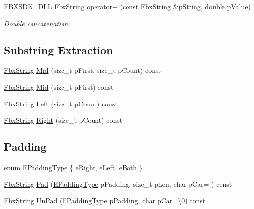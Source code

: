 \begin{DoxyCompactItemize}
\item 
\hyperlink{fbxarch_8h_a25d1298b33c31da5dbed969e0d4b4bc1}{F\+B\+X\+S\+D\+K\+\_\+\+D\+LL} \hyperlink{class_fbx_string}{Fbx\+String} \hyperlink{class_fbx_string_a358d5e7bed17720e4310db397dbcbf53}{operator+} (const \hyperlink{class_fbx_string}{Fbx\+String} \&p\+String, double p\+Value)
\begin{DoxyCompactList}\small\item\em Double concatenation. \end{DoxyCompactList}\end{DoxyCompactItemize}
\subsection*{Substring Extraction}
\begin{DoxyCompactItemize}
\item 
\hyperlink{class_fbx_string}{Fbx\+String} \hyperlink{class_fbx_string_a308c70f64a1f9504e550438af97a3eeb}{Mid} (size\+\_\+t p\+First, size\+\_\+t p\+Count) const
\item 
\hyperlink{class_fbx_string}{Fbx\+String} \hyperlink{class_fbx_string_abec59547bba055c6f339e77be28feb0a}{Mid} (size\+\_\+t p\+First) const
\item 
\hyperlink{class_fbx_string}{Fbx\+String} \hyperlink{class_fbx_string_a61c3156aa112a9b2a2eba59b37db1feb}{Left} (size\+\_\+t p\+Count) const
\item 
\hyperlink{class_fbx_string}{Fbx\+String} \hyperlink{class_fbx_string_a48148b426b07c11495d981e026b25857}{Right} (size\+\_\+t p\+Count) const
\end{DoxyCompactItemize}
\subsection*{Padding}
\begin{DoxyCompactItemize}
\item 
enum \hyperlink{class_fbx_string_aad7bebc948b8205ded9d750ea098ba21}{E\+Padding\+Type} \{ \hyperlink{class_fbx_string_aad7bebc948b8205ded9d750ea098ba21a5c49fbba54db4d64182275e7597b2251}{e\+Right}, 
\hyperlink{class_fbx_string_aad7bebc948b8205ded9d750ea098ba21a5cbbb3feefad7439df625b9bf0d1156b}{e\+Left}, 
\hyperlink{class_fbx_string_aad7bebc948b8205ded9d750ea098ba21ac12e68b40354386a78b357439b8b84bb}{e\+Both}
 \}
\item 
\hyperlink{class_fbx_string}{Fbx\+String} \hyperlink{class_fbx_string_a941a76b41dc91d4dfccd447e73567902}{Pad} (\hyperlink{class_fbx_string_aad7bebc948b8205ded9d750ea098ba21}{E\+Padding\+Type} p\+Padding, size\+\_\+t p\+Len, char p\+Car=\textquotesingle{} \textquotesingle{}) const
\item 
\hyperlink{class_fbx_string}{Fbx\+String} \hyperlink{class_fbx_string_aa8884e0a5e912d0f1c3a3c157d4787ff}{Un\+Pad} (\hyperlink{class_fbx_string_aad7bebc948b8205ded9d750ea098ba21}{E\+Padding\+Type} p\+Padding, char p\+Car=\textquotesingle{}\textbackslash{}0\textquotesingle{}) const
\end{DoxyCompactItemize}
